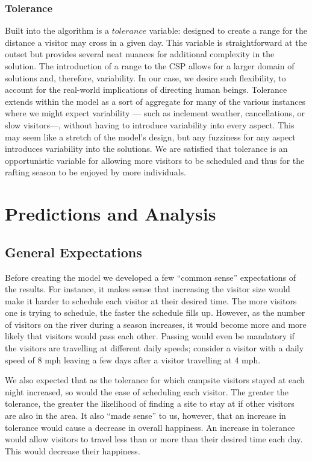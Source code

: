 \documentclass[11pt]{article} %
\begin{document}
\subsubsection{Tolerance}
Built into the algorithm is a $tolerance$ variable: designed to create a
range for the distance a  visitor may cross in a given day.  This variable
is straightforward at the outset but provides several neat nuances for additional
complexity in the solution.  The introduction of a range to the CSP allows
for a larger domain of solutions and, therefore, variability.  In our case,
we desire such flexibility, to account for the real-world implications of
directing human beings.  Tolerance extends within the model as a sort of
aggregate for many of the various instances where we might expect variability
--- such as inclement weather, cancellations, or slow  visitors---,
without having to introduce variability into every aspect.  This may seem
like a stretch of the model's design, but any fuzziness for
any aspect introduces variability into the solutions.  We are satisfied that
tolerance is an opportunistic variable for allowing more visitors to be
scheduled and thus for the rafting season to be enjoyed by more individuals.



\section{Predictions and Analysis}
\subsection{General Expectations}
\label{sec:expectations}
Before creating the model we developed a few “common sense” expectations of
the results. For instance, it makes sense that increasing the visitor size
would make it harder to schedule each visitor at their desired time. The more
visitors one is trying to schedule, the faster the schedule fills up. However,
as the number of visitors on the river during a season increases, it would
become more and more likely that visitors would pass each other. Passing
would even be mandatory if the visitors are travelling at different daily
speeds; consider a visitor with a daily speed of 8 mph leaving a few days
after a visitor travelling at 4 mph.

We also expected that as the tolerance for which campsite visitors stayed at
each night increased, so would the ease of scheduling each visitor. The
greater the tolerance, the greater the likelihood of finding a site to stay
at if other visitors are also in the area. It also “made sense” to us, however,
that an increase in tolerance would cause a decrease in overall happiness.
An increase in tolerance would allow visitors to travel less than or more
than their desired time each day. This would decrease their happiness.
\end{document}

